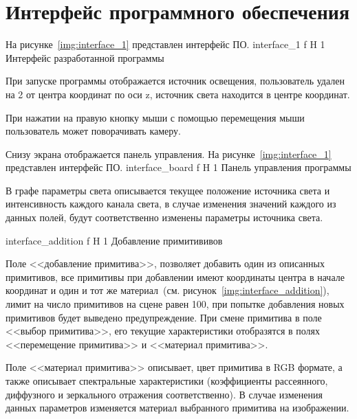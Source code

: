 \section{Интерфейс программного обеспечения}

На рисунке~\ref{img:interface_1} представлен интерфейс ПО.
{interface_1} %
{f} %
{H} %
{1\textwidth} %
{Интерфейс разработанной программы} %

При запуске программы отображается источник освещения, пользователь удален на 2 от центра координат по оси z, источник света находится в центре координат. 

При нажатии на правую кнопку мыши с помощью перемещения мыши пользователь может поворачивать камеру.

Снизу экрана отображается панель управления. 
На рисунке~\ref{img:interface_1} представлен интерфейс ПО.
{interface_board} %
{f} %
{H} %
{1\textwidth} %
{Панель управления программы} %

В графе параметры света описывается текущее положение источника света
и интенсивность каждого канала света, в случае изменения значений каждого из данных полей, будут соответственно изменены параметры источника света.

{interface_addition} %
{f} %
{H} %
{1\textwidth} %
{Добавление примитививов} %

Поле <<добавление примитива>>, позволяет добавить один из описанных примитивов, все примитивы при добавлении имеют координаты центра в начале координат и один и тот же материал~(см. рисунок~\ref{img:interface_addition}), лимит на число примитивов на сцене равен 100, при попытке добавления новых примитивов будет выведено предупреждение.
При смене примитива в поле <<выбор примитива>>, его текущие характеристики отобразятся в полях <<перемещение примитива>>  и <<материал примитива>>.

Поле <<материал примитива>> описывает, цвет примитива в RGB формате,
а также описывает спектральные характеристики (коэффициенты рассеянного, диффузного и зеркального отражения соответственно).
В случае изменения данных параметров изменяется материал выбранного примитива на изображении.

